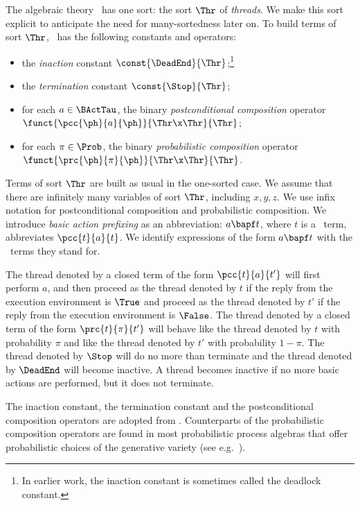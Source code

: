 \documentclass{llncs}
\begin{document}
The algebraic theory \prBTA\ has one sort: the sort $\Thr$ of 
\emph{threads}. 
We make this sort explicit to anticipate the need for many-sortedness
later on.
To build terms of sort $\Thr$, \prBTA\ has the following constants and 
operators:
\begin{itemize}
\item
the \emph{inaction} constant $\const{\DeadEnd}{\Thr}$;\footnote
{In earlier work, the inaction constant is sometimes called the deadlock
 constant.}
\item
the \emph{termination} constant $\const{\Stop}{\Thr}$;
\item
for each $a \in \BActTau$, the binary \emph{postconditional composition} 
operator $\funct{\pcc{\ph}{a}{\ph}}{\linebreak[2]\Thr \x \Thr}{\Thr}$;
\item
for each $\pi \in \Prob$, the binary \emph{probabilistic composition} 
operator $\funct{\prc{\ph}{\pi}{\ph}}{\Thr \x \Thr}{\Thr}$.
\end{itemize}
Terms of sort $\Thr$ are built as usual in the one-sorted case. 
We assume that there are infinitely many variables of sort $\Thr$, 
including $x,y,z$.
We use infix notation for postconditional composition and probabilistic
composition. 
We introduce \emph{basic action prefixing} as an abbreviation: 
$a \bapf t$, where $t$ is a \prBTA\ term, abbreviates 
$\pcc{t}{a}{t}$.
We identify expressions of the form $a \bapf t$ with the \prBTA\
terms they stand for.

The thread denoted by a closed term of the form $\pcc{t}{a}{t'}$
will first perform $a$, and then proceed as the thread denoted by
$t$ if the reply from the execution environment is $\True$ and proceed
as the thread denoted by $t'$ if the reply from the execution
environment is $\False$. 
The thread denoted by a closed term of the form $\prc{t}{\pi}{t'}$
will behave like the thread denoted by $t$ with probability $\pi$ and 
like the thread denoted by $t'$ with probability $1 - \pi$.
The thread denoted by $\Stop$ will do no more than terminate and 
the thread denoted by $\DeadEnd$ will become inactive.
A thread becomes inactive if no more basic actions are performed, but
it does not terminate.

The inaction constant, the termination constant and the postconditional 
composition operators are adopted from \BTA.
Counterparts of the probabilistic composition operators are found in 
most probabilistic process algebras that offer probabilistic choices of 
the generative variety (see e.g.~\cite{BBS95a}).
\end{document}
